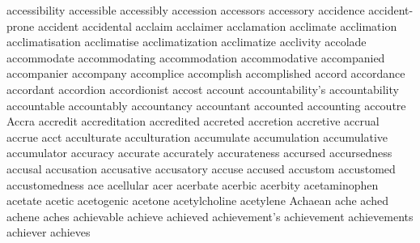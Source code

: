 accessibility accessible accessibly accession accessors accessory accidence accident-prone accident accidental acclaim acclaimer acclamation acclimate acclimation acclimatisation acclimatise acclimatization acclimatize acclivity accolade accommodate accommodating accommodation accommodative accompanied accompanier accompany accomplice accomplish accomplished accord accordance accordant accordion accordionist accost account accountability's accountability accountable accountably accountancy accountant accounted accounting accoutre Accra accredit accreditation accredited accreted accretion accretive accrual accrue acct acculturate acculturation accumulate accumulation accumulative accumulator accuracy accurate accurately accurateness accursed accursedness accusal accusation accusative accusatory accuse accused accustom accustomed accustomedness ace acellular acer acerbate acerbic acerbity acetaminophen acetate acetic acetogenic acetone acetylcholine acetylene Achaean ache ached achene aches achievable achieve achieved achievement's achievement achievements achiever achieves 